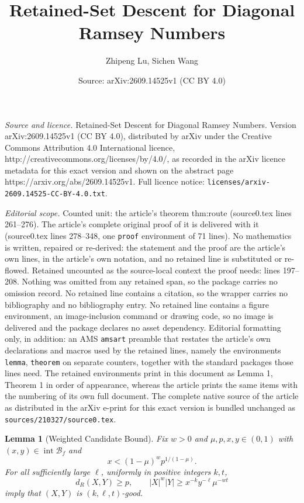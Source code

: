 \documentclass[10pt,a4paper]{amsart}
\title{Retained-Set Descent for Diagonal Ramsey Numbers}
\author{Zhipeng Lu, Sichen Wang}
\date{Source: arXiv:2609.14525v1 (CC BY 4.0)}
\newtheorem{lemma}{Lemma}
\newcommand{\BB}{\mathcal B}
\begin{document}
\maketitle

\noindent\emph{Source and licence.} Retained-Set Descent for Diagonal Ramsey Numbers. Version arXiv:2609.14525v1 (CC BY 4.0), distributed by arXiv under the Creative Commons Attribution 4.0 International licence, http://creativecommons.org/licenses/by/4.0/, as recorded in the arXiv licence metadata for this exact version and shown on the abstract page https://arxiv.org/abs/2609.14525v1. Full licence notice: \texttt{licenses/arxiv-2609.14525-CC-BY-4.0.txt}.\par\smallskip

\noindent\textit{Editorial scope.} Counted unit: the article's theorem thm:route (source0.tex lines 261--276). The article's complete original proof of it is delivered with it (source0.tex lines 278--348, one \texttt{proof} environment of 71 lines). No mathematics is written, repaired or re-derived: the statement and the proof are the article's own lines, in the article's own notation, and no retained line is substituted or re-flowed.  Retained uncounted as the source-local context the proof needs: lines 197--208.  Nothing was omitted from any retained span, so the package carries no omission record.  No retained line contains a citation, so the wrapper carries no bibliography and no bibliography entry.  No retained line contains a figure environment, an image-inclusion command or drawing code, so no image is delivered and the package declares no asset dependency.  Editorial formatting only, in addition: an AMS \texttt{amsart} preamble that restates the article's own declarations and macros used by the retained lines, namely the environments \texttt{lemma}, \texttt{theorem} on separate counters, together with the standard packages those lines need.  The retained environments print in this document as Lemma 1, Theorem 1 in order of appearance, whereas the article prints the same items with the numbering of its own full document.  The complete native source of the article as distributed in the arXiv e-print for this exact version is bundled unchanged as \texttt{sources/210327/source0.tex}.
\begin{lemma}[Weighted Candidate Bound]\label{prop:candidate}
Fix $w>0$ and $\mu,p,x,y\in(0,1)$ with $(x,y)\in\operatorname{int}\BB_f$ and
\[
 x<(1-\mu)^w p^{1/(1-\mu)}.
\]
For all sufficiently large $\ell$, uniformly in positive integers $k,t$,
\[
 d_R(X,Y)\ge p,\qquad
 |X|^w|Y|\ge x^{-k}y^{-\ell}\mu^{-wt}
\]
imply that $(X,Y)$ is $(k,\ell,t)$-good.
\end{lemma}
\end{document}
